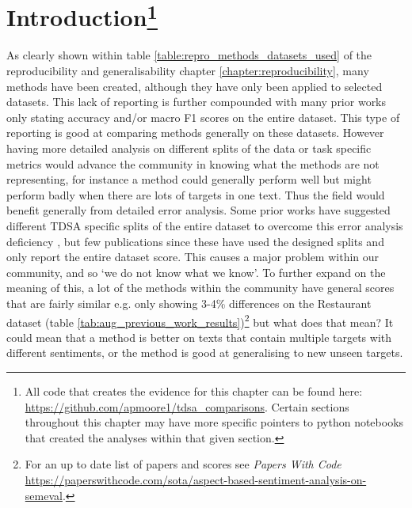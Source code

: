 \section[Introduction]{Introduction\footnote{All code that creates the evidence for this chapter can be found here: \url{https://github.com/apmoore1/tdsa_comparisons}. Certain sections throughout this chapter may have more specific pointers to python notebooks that created the analyses within that given section.}}
\label{section:aug_introduction}
As clearly shown within table \ref{table:repro_methods_datasets_used} of the reproducibility and generalisability chapter \ref{chapter:reproducibility}, many methods have been created, although they have only been applied to selected datasets. This lack of reporting is further compounded with many prior works only stating accuracy and/or macro F1 scores on the entire dataset. This type of reporting is good at comparing methods generally on these datasets. However having more detailed analysis on different splits of the data or task specific metrics would advance the community in knowing what the methods are not representing, for instance a method could generally perform well but might perform badly when there are lots of targets in one text. Thus the field would benefit generally from detailed error analysis. Some prior works have suggested different TDSA specific splits of the entire dataset to overcome this error analysis deficiency \citep{nguyen-shirai-2015-phrasernn,wang-etal-2017-tdparse,he-etal-2018-effective,yang2018multi}, but few publications since these have used the designed splits and only report the entire dataset score. This causes a major problem within our community, and so `we do not know what we know'. To further expand on the meaning of this, a lot of the methods within the community have general scores that are fairly similar e.g. only showing 3-4\% differences on the Restaurant dataset (table \ref{tab:aug_previous_work_results})\footnote{For an up to date list of papers and scores see \textit{Papers With Code} \url{https://paperswithcode.com/sota/aspect-based-sentiment-analysis-on-semeval}.} but what does that mean? It could mean that a method is better on texts that contain multiple targets with different sentiments, or the method is good at generalising to new unseen targets. 

